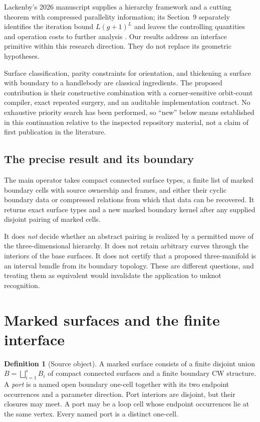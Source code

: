\documentclass[11pt]{article}
\theoremstyle{definition}
\newtheorem{definition}[theorem]{Definition}
\theoremstyle{remark}\newtheorem{remark}[theorem]{Remark}
\begin{document}
Lackenby's 2026 manuscript supplies a hierarchy framework and a cutting theorem with compressed parallelity information; its Section~9 separately identifies the iteration bound $L(g+1)^L$ and leaves the controlling quantities and operation costs to further analysis \cite[Sections~9 and 14]{lackenby}. Our results address an interface primitive within this research direction. They do not replace its geometric hypotheses.

Surface classification, parity constraints for orientation, and thickening a surface with boundary to a handlebody are classical ingredients. The proposed contribution is their constructive combination with a corner-sensitive orbit-count compiler, exact repeated surgery, and an auditable implementation contract. No exhaustive priority search has been performed, so ``new'' below means established in this continuation relative to the inspected repository material, not a claim of first publication in the literature.

\subsection{The precise result and its boundary}
The main operator takes compact connected surface types, a finite list of marked boundary cells with source ownership and frames, and either their cyclic boundary data or compressed relations from which that data can be recovered. It returns exact surface types and a new marked boundary kernel after any supplied disjoint pairing of marked cells.

It does \emph{not} decide whether an abstract pairing is realized by a permitted move of the three-dimensional hierarchy. It does not retain arbitrary curves through the interiors of the base surfaces. It does not certify that a proposed three-manifold is an interval bundle from its boundary topology. These are different questions, and treating them as equivalent would invalidate the application to unknot recognition.

\section{Marked surfaces and the finite interface}
\label{sec:model}

\begin{definition}[Source object]
A marked surface consists of a finite disjoint union
$B=\bigsqcup_{i=1}^s B_i$ of compact connected surfaces and a finite boundary CW structure. A \emph{port} is a named open boundary one-cell together with its two endpoint occurrences and a parameter direction. Port interiors are disjoint, but their closures may meet. A port may be a loop cell whose endpoint occurrences lie at the same vertex. Every named port is a distinct one-cell.
\end{definition}
\end{document}
